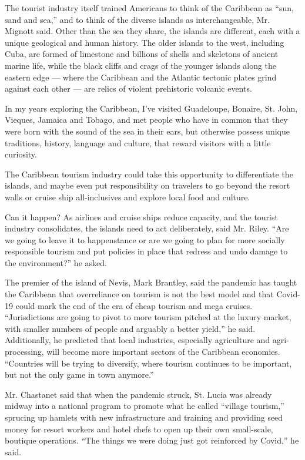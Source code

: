 The tourist industry itself trained Americans to think of the Caribbean
as ``sun, sand and sea,'' and to think of the diverse islands as
interchangeable, Mr. Mignott said. Other than the sea they share, the
islands are different, each with a unique geological and human history.
The older islands to the west, including Cuba, are formed of limestone
and billions of shells and skeletons of ancient marine life, while the
black cliffs and crags of the younger islands along the eastern edge ---
where the Caribbean and the Atlantic tectonic plates grind against each
other --- are relics of violent prehistoric volcanic events.

In my years exploring the Caribbean, I've visited Guadeloupe, Bonaire,
St. John, Vieques, Jamaica and Tobago, and met people who have in common
that they were born with the sound of the sea in their ears, but
otherwise possess unique traditions, history, language and culture, that
reward visitors with a little curiosity.

The Caribbean tourism industry could take this opportunity to
differentiate the islands, and maybe even put responsibility on
travelers to go beyond the resort walls or cruise ship all-inclusives
and explore local food and culture.

Can it happen? As airlines and cruise ships reduce capacity, and the
tourist industry consolidates, the islands need to act deliberately,
said Mr. Riley. ``Are we going to leave it to happenstance or are we
going to plan for more socially responsible tourism and put policies in
place that redress and undo damage to the environment?'' he asked.

The premier of the island of Nevis, Mark Brantley, said the pandemic has
taught the Caribbean that overreliance on tourism is not the best model
and that Covid-19 could mark the end of the era of cheap tourism and
mega cruises. ``Jurisdictions are going to pivot to more tourism pitched
at the luxury market, with smaller numbers of people and arguably a
better yield,'' he said. Additionally, he predicted that local
industries, especially agriculture and agri-processing, will become more
important sectors of the Caribbean economies. ``Countries will be trying
to diversify, where tourism continues to be important, but not the only
game in town anymore.''

Mr. Chastanet said that when the pandemic struck, St. Lucia was already
midway into a national program to promote what he called ``village
tourism,'' sprucing up hamlets with new infrastructure and training and
providing seed money for resort workers and hotel chefs to open up their
own small-scale, boutique operations. ``The things we were doing just
got reinforced by Covid,'' he said.


